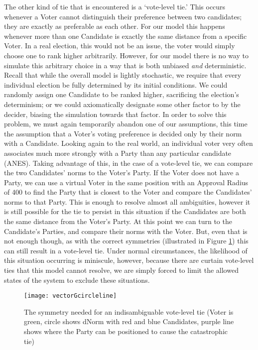 \documentclass[12pt]{article}
\begin{document}
\qquad The other kind of tie that is encountered is a `vote-level tie.' This occurs whenever a Voter cannot distinguish their preference between two candidates; they are exactly as preferable as each other. For our model this happens whenever more than one Candidate is exactly the same distance from a specific Voter. In a real election, this would not be an issue, the voter would simply choose one to rank higher arbitrarily. However, for our model there is no way to simulate this arbitrary choice in a way that is both unbiased \textit{and} deterministic. Recall that while the overall model is lightly stochastic, we require that every individual election be fully determined by its initial conditions. We could randomly assign one Candidate to be ranked higher, sacrificing the election's determinism; or we could axiomatically designate some other factor to by the decider, biasing the simulation towards that factor. In order to solve this problem, we must again temporarily abandon one of our assumptions, this time the assumption that a Voter's voting preference is decided only by their norm with a Candidate. Looking again to the real world, an individual voter very often associates much more strongly with a Party than any particular candidate (ANES). Taking advantage of this, in the case of a vote-level tie, we can compare the two Candidates' norms to the Voter's Party. If the Voter does not have a Party, we can use a virtual Voter in the same position with an Approval Radius of 400 to find the Party that is closest to the Voter and compare the Candidates' norms to that Party. This is enough to resolve almost all ambiguities, however it is still possible for the tie to persist in this situation if the Candidates are both the same distance from the Voter's Party. At this point we can turn to the Candidate's Parties, and compare their norms with the Voter. But, even that is not enough though, as with the correct symmetries (illustrated in Figure \ref{tieSymmetry}) this can still result in a vote-level tie. Under normal circumstances, the likelihood of this situation occurring is miniscule, however, because there are curtain vote-level ties that this model cannot resolve, we are simply forced to limit the allowed states of the system to exclude these situations.
\begin{figure}[H]
\centering
\texttt{[image: vectorGcircleline]}
\caption{\footnotesize The symmetry needed for an indisambiguable vote-level tie (Voter is green, circle shows dNorm with red and blue Candidates, purple line shows where the Party can be positioned to cause the catastrophic tie)}
\label{tieSymmetry}
\end{figure}
\end{document}

